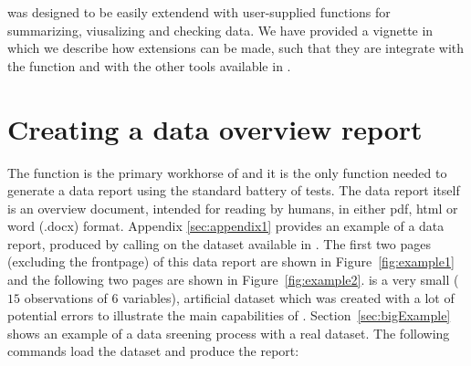\documentclass[article,shortnames]{jss}
\begin{document}
 was designed to be easily extendend with user-supplied
functions for summarizing, viusalizing and checking data. We have
provided a vignette in which we describe how  extensions
can be made, such that they are integrate with the
 function and with the other tools available in
.



\section{Creating a data overview report}
\label{sec:usingdataMaid}

The  function is the primary workhorse of
 and it is the only function needed to generate a data
report using the standard battery of tests. The data report itself is
an overview document, intended for reading by humans, in either pdf,
html or word (.docx) format. Appendix \ref{sec:appendix1} provides an
example of a data report, produced by calling 
on the dataset  available in . The first
two pages (excluding the frontpage) of this data report are shown in
Figure~\ref{fig:example1} and the following two pages are shown in
Figure~\ref{fig:example2}.  is a very small ($15$
observations of $6$ variables), artificial dataset which was created
with a lot of potential errors to illustrate the main capabilities of
. Section~\ref{sec:bigExample} shows an example of a data sreening
process with a real dataset. The following commands load the dataset
and produce the report:
\end{document}
